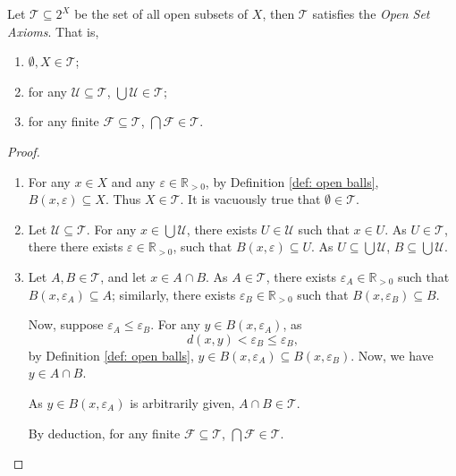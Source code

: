 \begin{theorem}
	\label{thm: open set axioms}
	Let $\mathcal T \subseteq 2^X$ be the set of all open subsets of $X$, then $\mathcal T$ satisfies the \textit{Open Set Axioms}. That is,
	\begin{enumerate}
		\item
		\label{thm: open set axioms: necessary elements}
		$\emptyset , X \in \mathcal T$;
		
		\item
		\label{thm: open set axioms: closed under arbitrary intersection}
		for any $\mathcal U \subseteq \mathcal T$, $\bigcup \mathcal U \in \mathcal T$;
		
		\item
		\label{thm: open set axioms: closed under finite intersection}
		for any finite $\mathcal F \subseteq \mathcal T$, $\bigcap \mathcal F \in \mathcal T$.
	\end{enumerate}
	
	\begin{proof} \
		\begin{enumerate}
			\item
			 For any $x \in X$ and any $\varepsilon \in \mathbb R_{> 0}$, by Definition \ref{def: open balls}, $B(x, \varepsilon) \subseteq X$. Thus $X \in \mathcal T$. It is vacuously true that $\emptyset \in \mathcal T$.
			 \qedlm
			 
			 \item
			 Let $\mathcal U \subseteq \mathcal T$. For any $x \in \bigcup \mathcal U$, there exists $U \in \mathcal U$ such that $x \in U$. As $U \in \mathcal T$, there there exists $\varepsilon \in \mathbb R_{> 0}$, such that $B(x, \varepsilon) \subseteq U$. As $U \subseteq \bigcup \mathcal U$, $B \subseteq \bigcup \mathcal U$.
			 \qedlm
			 
			 \item
			 Let $A, B \in \mathcal T$, and let $x \in A \cap B$. As $A \in \mathcal T$, there exists $\varepsilon_A \in \mathbb R_{> 0}$ such that $B(x, \varepsilon_A ) \subseteq A$; similarly, there exists $\varepsilon_B \in \mathbb R_{> 0}$ such that $B(x, \varepsilon_B) \subseteq B$.
			 
			 Now, suppose $\varepsilon_A \le \varepsilon_B$. For any $y \in B(x, \varepsilon_A)$, as
			 $$
			 d(x,y) < \varepsilon_B \le \varepsilon_B,
			 $$
			 by Definition \ref{def: open balls}, $y \in B(x, \varepsilon_A) \subseteq B(x, \varepsilon_B)$. Now, we have $y \in A \cap B$.
			 
			 As $y \in B(x, \varepsilon_A)$ is arbitrarily given, $A \cap B \in \mathcal T$.
			 
			 By deduction, for any finite $\mathcal F \subseteq \mathcal T$, $\bigcap \mathcal F \in \mathcal T$.
		\end{enumerate}
	\end{proof}
\end{theorem}


